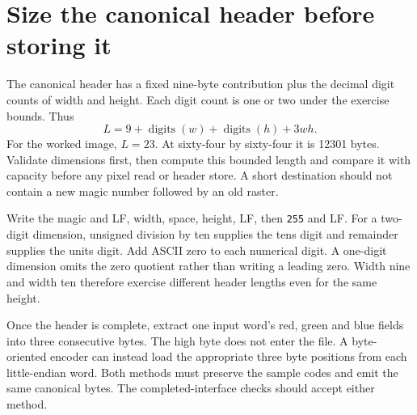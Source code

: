 \section{Size the canonical header before storing it}
The canonical header has a fixed nine-byte contribution plus the decimal digit counts
of width and height. Each digit count is one or two under the exercise bounds. Thus
\[
 L=9+\operatorname{digits}(w)+\operatorname{digits}(h)+3wh.
\]
For the worked image, \(L=23\). At sixty-four by sixty-four it is 12301 bytes.
Validate dimensions first, then compute this bounded length and compare it with capacity
before any pixel read or header store. A short destination should not contain a new
magic number followed by an old raster.

Write the magic and LF, width, space, height, LF, then \texttt{255} and LF. For a
two-digit dimension, unsigned division by ten supplies the tens digit and remainder
supplies the units digit. Add ASCII zero to each numerical digit. A one-digit dimension
omits the zero quotient rather than writing a leading zero. Width nine and width ten
therefore exercise different header lengths even for the same height.

Once the header is complete, extract one input word's red, green and blue fields into
three consecutive bytes. The high byte does not enter the file. A byte-oriented encoder
can instead load the appropriate three byte positions from each little-endian word.
Both methods must preserve the sample codes and emit the same canonical bytes. The
completed-interface checks should accept either method.
